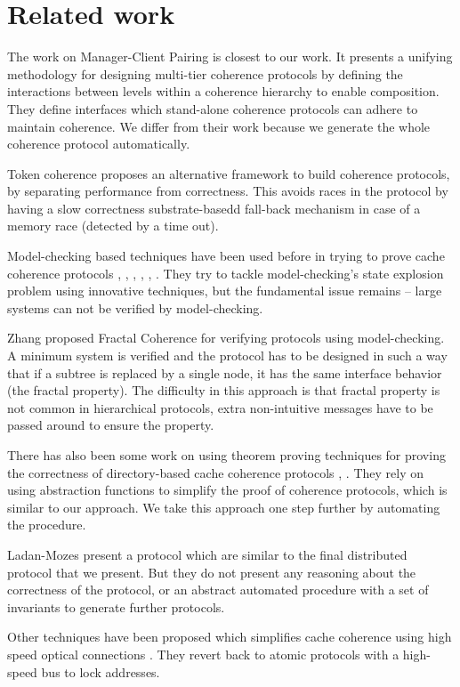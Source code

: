 \section{Related work}
\label{sec:related}

The work on Manager-Client Pairing \cite{mcp} is closest to our work. It
presents a unifying methodology for designing multi-tier coherence protocols by
defining the interactions between levels within a coherence hierarchy to enable
composition. They define interfaces which stand-alone coherence protocols can
adhere to maintain coherence. We differ from their work because we generate
the whole coherence protocol automatically.

Token coherence \cite{token} proposes an alternative framework to build
coherence protocols, by separating performance from correctness. This avoids
races in the protocol by having a slow correctness substrate-basedd fall-back
mechanism in case of a memory race (detected by a time out).

Model-checking based techniques have been used before in trying to prove cache
coherence protocols \cite{Clarke}, \cite{Chou}, \cite{ip}, \cite{McMillan},
\cite{pong}, \cite{Stern}. They try to tackle model-checking's state explosion
problem using innovative techniques, but the fundamental issue remains -- large
systems can not be verified by model-checking.

Zhang \etal proposed Fractal Coherence \cite{Zhang} for verifying protocols
using model-checking. A minimum system is verified and the protocol has to be
designed in such a way that if a subtree is replaced by a single node, it has
the same interface behavior (the fractal property). The difficulty in this
approach is that fractal property is not common in hierarchical protocols, extra
non-intuitive messages have to be passed around to ensure the property.

There has also been some work on using theorem proving techniques for proving
the correctness of directory-based cache coherence protocols \cite{loew},
\cite{park}. They rely on using abstraction functions to simplify the proof of
coherence protocols, which is similar to our approach. We take this approach one
step further by automating the procedure.

Ladan-Mozes \etal \cite{edya} present a protocol which are similar to the final
distributed protocol that we present. But they do not present any reasoning
about the correctness of the protocol, or an abstract automated procedure with
a set of invariants to generate further protocols.

Other techniques have been proposed which simplifies cache coherence using high
speed optical connections \cite{lipasti}. They revert back to atomic protocols
with a high-speed bus to lock addresses.

